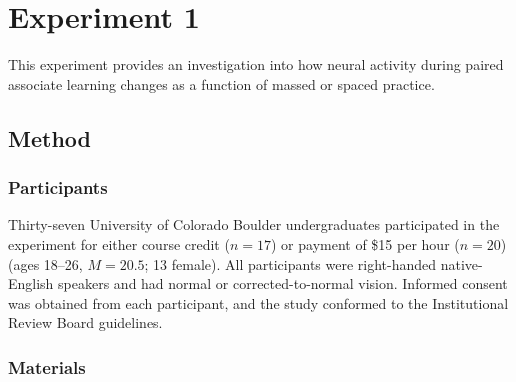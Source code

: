 
\chapter{Experiment 1}

This experiment provides an investigation into how neural activity during paired associate learning changes as a function of massed or spaced practice.

\section{Method}

\subsection{Participants}



Thirty-seven University of Colorado Boulder undergraduates participated in the experiment for either course credit ($n=17$) or payment of \$15 per hour ($n=20$) (ages 18--26, $M=20.5$; 13 female).  All participants were right-handed native-English speakers and had normal or corrected-to-normal vision.  Informed consent was obtained from each participant, and the study conformed to the
Institutional Review Board guidelines.

\subsection{Materials}

